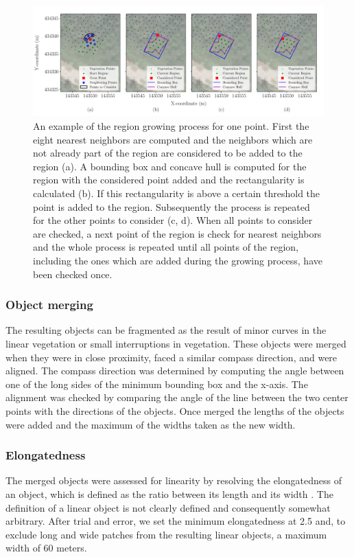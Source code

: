 \begin{figure}
	\centering
	\includegraphics[width=\columnwidth]{./img/region_growing.pdf}
	\caption{An example of the region growing process for one point. First the eight nearest neighbors are computed and the neighbors which are not already part of the region are considered to be added to the region (a). A bounding box and concave hull is computed for the region with the considered point added and the rectangularity is calculated (b). If this rectangularity is above a certain threshold the point is added to the region. Subsequently the process is repeated for the other points to consider (c, d). When all points to consider are checked, a next point of the region is check for nearest neighbors and the whole process is repeated until all points of the region, including the ones which are added during the growing process, have been checked once.}
	\label{fig:regiongrowing}
\end{figure}

\subsubsection{Object merging}
The resulting objects can be fragmented as the result of minor curves in the linear vegetation or small interruptions in vegetation. These objects were merged when they were in close proximity, faced a similar compass direction, and were aligned. The compass direction was determined by computing the angle between one of the long sides of the minimum bounding box and the x-axis. The alignment was checked by comparing the angle of the line between the two center points with the directions of the objects. Once merged the lengths of the objects were added and the maximum of the widths taken as the new width.

\subsubsection{Elongatedness}
The merged objects were assessed for linearity by resolving the elongatedness of an object, which is defined as the ratio between its length and its width \citep{nagao2013structural}. The definition of a linear object is not clearly defined and consequently somewhat arbitrary. After trial and error, we set the minimum elongatedness at 2.5 and, to exclude long and wide patches from the resulting linear objects, a maximum width of 60 meters.

